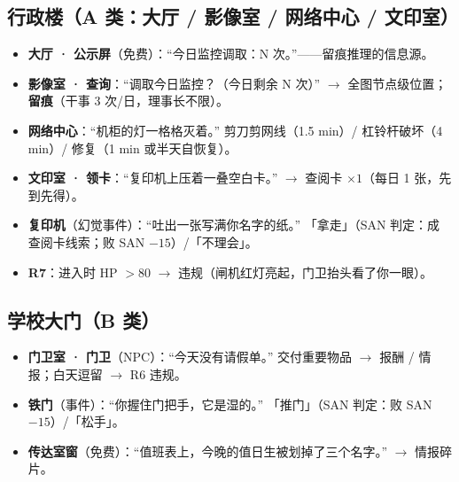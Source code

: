 \documentclass[UTF8, fontset=none, 11pt]{ctexart}
\begin{document}
\subsection{行政楼（A 类：大厅 / 影像室 / 网络中心 / 文印室）}
\begin{itemize}
  \item \textbf{大厅 · 公示屏}（免费）：``今日监控调取：N 次。''——留痕推理的信息源。
  \item \textbf{影像室 · 查询}：``调取今日监控？（今日剩余 N 次）'' $\to$ 全图节点级位置；\textbf{留痕}（干事 3 次/日，理事长不限）。
  \item \textbf{网络中心}：``机柜的灯一格格灭着。'' 剪刀剪网线（1.5 min）/ 杠铃杆破坏（4 min）/ 修复（1 min 或半天自恢复）。
  \item \textbf{文印室 · 领卡}：``复印机上压着一叠空白卡。'' $\to$ 查阅卡 $\times 1$（每日 1 张，先到先得）。
  \item \textbf{复印机}（幻觉事件）：``吐出一张写满你名字的纸。'' 「拿走」（SAN 判定：成 查阅卡线索；败 SAN $-15$）/「不理会」。
  \item \textbf{R7}：进入时 HP $>80$ $\to$ 违规（闸机红灯亮起，门卫抬头看了你一眼）。
\end{itemize}

\subsection{学校大门（B 类）}
\begin{itemize}
  \item \textbf{门卫室 · 门卫}（NPC）：``今天没有请假单。'' 交付重要物品 $\to$ 报酬 / 情报；白天逗留 $\to$ R6 违规。
  \item \textbf{铁门}（事件）：``你握住门把手，它是湿的。'' 「推门」（SAN 判定：败 SAN $-15$）/「松手」。
  \item \textbf{传达室窗}（免费）：``值班表上，今晚的值日生被划掉了三个名字。'' $\to$ 情报碎片。
\end{itemize}
\end{document}
